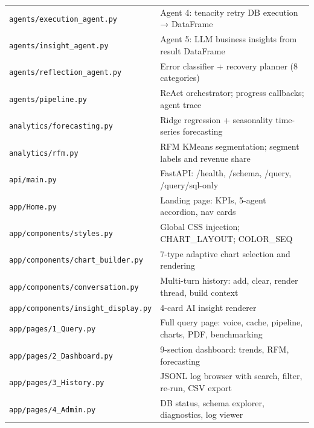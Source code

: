 \documentclass[12pt,a4paper]{report}
\begin{document}
\begin{longtable}{lp{10cm}}
  \texttt{agents/execution\_agent.py}  & Agent 4: tenacity retry DB execution → DataFrame \\
  \texttt{agents/insight\_agent.py}    & Agent 5: LLM business insights from result DataFrame \\
  \texttt{agents/reflection\_agent.py} & Error classifier + recovery planner (8 categories) \\
  \texttt{agents/pipeline.py}          & ReAct orchestrator; progress callbacks; agent trace \\
  \texttt{analytics/forecasting.py}    & Ridge regression + seasonality time-series forecasting \\
  \texttt{analytics/rfm.py}            & RFM KMeans segmentation; segment labels and revenue share \\
  \texttt{api/main.py}                 & FastAPI: /health, /schema, /query, /query/sql-only \\
  \texttt{app/Home.py}                 & Landing page: KPIs, 5-agent accordion, nav cards \\
  \texttt{app/components/styles.py}    & Global CSS injection; CHART\_LAYOUT; COLOR\_SEQ \\
  \texttt{app/components/chart\_builder.py} & 7-type adaptive chart selection and rendering \\
  \texttt{app/components/conversation.py}  & Multi-turn history: add, clear, render thread, build context \\
  \texttt{app/components/insight\_display.py} & 4-card AI insight renderer \\
  \texttt{app/pages/1\_Query.py}       & Full query page: voice, cache, pipeline, charts, PDF, benchmarking \\
  \texttt{app/pages/2\_Dashboard.py}   & 9-section dashboard: trends, RFM, forecasting \\
  \texttt{app/pages/3\_History.py}     & JSONL log browser with search, filter, re-run, CSV export \\
  \texttt{app/pages/4\_Admin.py}       & DB status, schema explorer, diagnostics, log viewer \\

\end{longtable}

\end{document}
